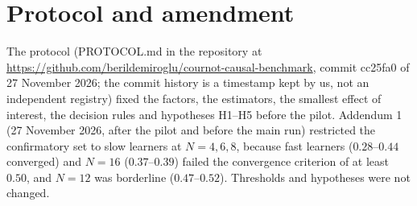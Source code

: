 \documentclass[11pt]{article}
\begin{document}
\section{Protocol and amendment}\label{app:protocol}
The protocol (PROTOCOL.md in the repository at \url{https://github.com/berildemiroglu/cournot-causal-benchmark}, commit cc25fa0 of 27 November 2026; the commit history is a timestamp kept by us, not an independent registry) fixed the factors, the estimators, the smallest effect of interest, the decision rules and hypotheses H1--H5 before the pilot. Addendum 1 (27 November 2026, after the pilot and before the main run) restricted the confirmatory set to slow learners at $N=4,6,8$, because fast learners ($0.28$--$0.44$ converged) and $N=16$ ($0.37$--$0.39$) failed the convergence criterion of at least $0.50$, and $N=12$ was borderline ($0.47$--$0.52$). Thresholds and hypotheses were not changed.
\end{document}

